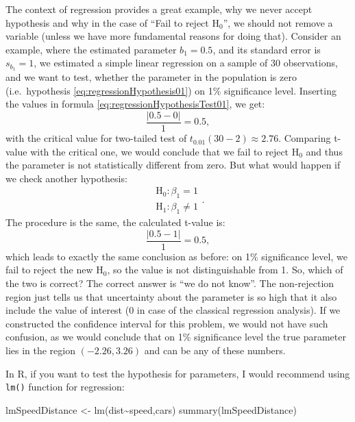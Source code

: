 \documentclass[
]{book}
\newenvironment{Shaded}{\begin{snugshade}}{\end{snugshade}}
\newcommand{\FunctionTok}[1]{\textcolor[rgb]{0.00,0.00,0.00}{#1}}
\newcommand{\NormalTok}[1]{#1}
\newcommand{\OtherTok}[1]{\textcolor[rgb]{0.56,0.35,0.01}{#1}}
\newcommand{\SpecialCharTok}[1]{\textcolor[rgb]{0.00,0.00,0.00}{#1}}
\theoremstyle{definition}
\theoremstyle{definition}
\theoremstyle{definition}
\theoremstyle{definition}
\theoremstyle{remark}
\begin{document}
The context of regression provides a great example, why we never accept hypothesis and why in the case of ``Fail to reject H\(_0\)'', we should not remove a variable (unless we have more fundamental reasons for doing that). Consider an example, where the estimated parameter \(b_1=0.5\), and its standard error is \(s_{b_1}=1\), we estimated a simple linear regression on a sample of 30 observations, and we want to test, whether the parameter in the population is zero (i.e.~hypothesis \eqref{eq:regressionHypothesis01}) on 1\% significance level. Inserting the values in formula \eqref{eq:regressionHypothesisTest01}, we get:
\begin{equation*}
    \frac{|0.5 - 0|}{1} = 0.5,
\end{equation*}
with the critical value for two-tailed test of \(t_{0.01}(30-2)\approx 2.76\). Comparing t-value with the critical one, we would conclude that we fail to reject H\(_0\) and thus the parameter is not statistically different from zero. But what would happen if we check another hypothesis:
\begin{equation*}
    \begin{aligned}
        \mathrm{H}_0: \beta_1 = 1 \\
        \mathrm{H}_1: \beta_1 \neq 1
    \end{aligned} .
\end{equation*}
The procedure is the same, the calculated t-value is:
\begin{equation*}
    \frac{|0.5 - 1|}{1} = 0.5,
\end{equation*}
which leads to exactly the same conclusion as before: on 1\% significance level, we fail to reject the new H\(_0\), so the value is not distinguishable from 1. So, which of the two is correct? The correct answer is ``we do not know''. The non-rejection region just tells us that uncertainty about the parameter is so high that it also include the value of interest (0 in case of the classical regression analysis). If we constructed the confidence interval for this problem, we would not have such confusion, as we would conclude that on 1\% significance level the true parameter lies in the region \((-2.26, 3.26)\) and can be any of these numbers.

In R, if you want to test the hypothesis for parameters, I would recommend using \texttt{lm()} function for regression:

\begin{Shaded}
\begin{Highlighting}[]
\NormalTok{lmSpeedDistance }\OtherTok{\textless{}{-}} \FunctionTok{lm}\NormalTok{(dist}\SpecialCharTok{\textasciitilde{}}\NormalTok{speed,cars)}
\FunctionTok{summary}\NormalTok{(lmSpeedDistance)}
\end{Highlighting}
\end{Shaded}
\end{document}
